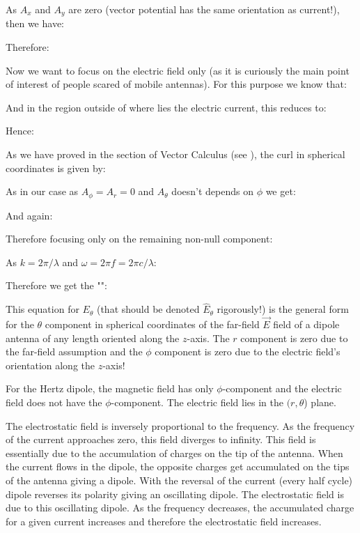 	As $A_x$ and $A_y$ are zero (vector potential has the same orientation as current!), then we have:
	
	Therefore:
	
	Now we want to focus on the electric field only (as it is curiously the main point of interest of people scared of mobile antennas). For this purpose we know that:
	
	And in the region outside of where lies the electric current, this reduces to:
	
	Hence:
	
	As we have proved in the section of Vector Calculus (see \pageref{rotational in spherical coordinates}), the curl in spherical coordinates is given by:
	
	As in our case as $A_\phi=A_r=0$ and $A_\theta$ doesn't depends on $\phi$ we get:
	
	And again:
	
	Therefore focusing only on the remaining non-null component:
	
	As $k=2\pi/\lambda$ and $\omega=2\pi f=2\pi c/\lambda$:
	
	Therefore we get the "":
	
	This equation for $E_\theta$ (that should be denoted $\hat{E}_\theta$ rigorously!) is the general form for the $\theta$ component in spherical coordinates of the far-field $\vec{E}$ field of a dipole antenna of any length oriented along the $z$-axis. The $r$ component is zero due to the far-field assumption and the $\phi$ component is zero due to the electric field's orientation along the $z$-axis!
	
	For the Hertz dipole, the magnetic field has only $\phi$-component and the electric field does not have the $\phi$-component. The electric field lies in the $(r,\theta$) plane.
	
	The electrostatic field is inversely proportional to the frequency. As the frequency of the  current approaches zero, this field diverges to infinity. This field is essentially due to the accumulation of charges on the tip of the antenna. When the current flows in the dipole, the opposite charges get accumulated on the tips of the antenna giving a dipole. With the reversal of the current (every half cycle) dipole reverses its polarity giving an oscillating dipole.  The  electrostatic field is due to this oscillating dipole.  As the frequency decreases, the   accumulated charge for a given current increases and therefore the electrostatic field increases.
	
